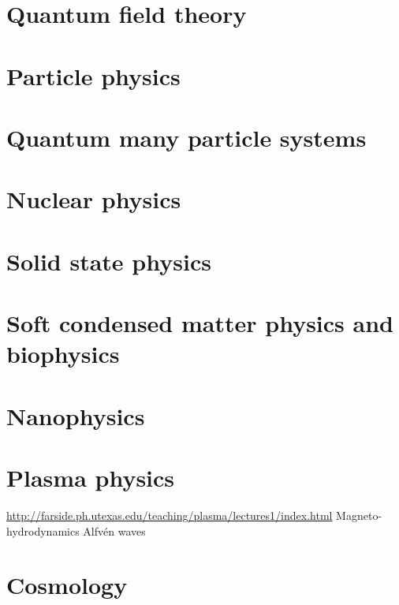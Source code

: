 \documentclass{report}
\begin{document}
\part{Quantum field theory}
\setcounter{chapter}{0} %


\part{Particle physics}
\setcounter{chapter}{0} %


\part{Quantum many particle systems}
\setcounter{chapter}{0} %


\part{Nuclear physics}
\setcounter{chapter}{0} %


\part{Solid state physics}
\setcounter{chapter}{0} %


\part{Soft condensed matter physics and biophysics}
\setcounter{chapter}{0} %


\part{Nanophysics}
\setcounter{chapter}{0} %


\part{Plasma physics}
\setcounter{chapter}{0} %
\url{http://farside.ph.utexas.edu/teaching/plasma/lectures1/index.html}
    Magneto-hydrodynamics
    Alfvén waves


\part{Cosmology}
\setcounter{chapter}{0} %

\end{document}
